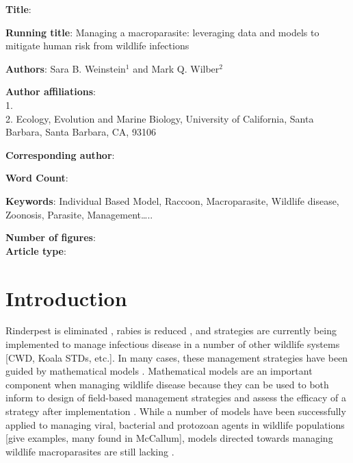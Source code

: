 \documentclass[11pt]{article}
\begin{document}
\noindent
\textbf{Title}: 

\bigskip

\noindent
\textbf{Running title}: Managing a macroparasite: leveraging data and models to mitigate human risk from wildlife infections

\bigskip

\noindent
\textbf{Authors}: Sara B. Weinstein$^1$ and Mark Q. Wilber$^2$

\bigskip

\noindent
\textbf{Author affiliations}: \\
1. \\
2. Ecology, Evolution and Marine Biology, University of California, Santa Barbara, Santa Barbara, CA, 93106 \\

\bigskip

\noindent
\textbf{Corresponding author}:

\bigskip

\noindent
\textbf{Word Count}: 

\bigskip

\noindent
\textbf{Keywords}: Individual Based Model, Raccoon, Macroparasite,
Wildlife disease, Zoonosis, Parasite, Management\ldots{}..

\bigskip

\noindent
\textbf{Number of figures}:  \\
\textbf{Article type}: 

\clearpage

\section{Introduction}

Rinderpest is eliminated \citep{Roeder2011}, rabies is reduced \citep{Freuling2013}, and strategies are currently being implemented to manage infectious disease in a number of other wildlife systems [CWD, Koala STDs, etc.]. In many cases, these management strategies have been
guided by mathematical models \citep[e.g.][]{Restif2012,McCallum2017}.  Mathematical models are an important component when managing wildlife disease because they can be used to both inform to design of field-based management strategies and assess the efficacy of a strategy after implementation  \citep{Restif2012}.  While a number of models have been successfully applied to managing
viral, bacterial and protozoan agents in wildlife populations [give examples, many found in McCallum], models directed
towards managing wildlife macroparasites are still lacking \citep[][, but see X X X for macroparasite models in livestock]{McCallum2017}.
\end{document}
